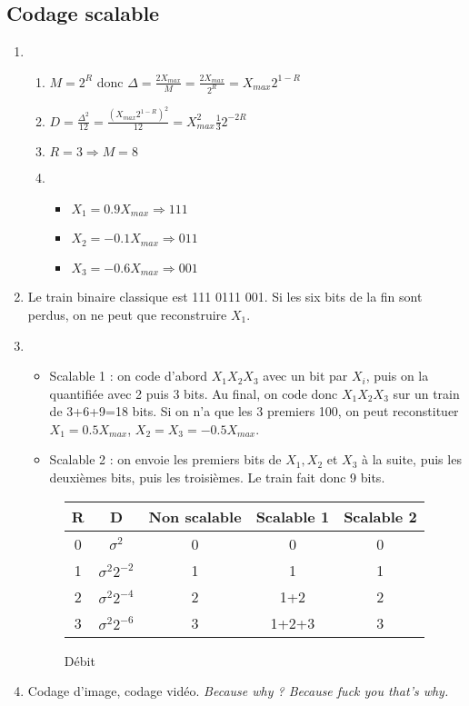 \documentclass{../../td}
\begin{document}
\subsection{Codage scalable}
\begin{enumerate}\setlength{\itemsep}{5mm}

\item
\begin{enumerate}
\item $M=2^R$ donc $\Delta = \frac{2X_{max}}{M} = \frac{2X_{max}}{2^R} = X_{max}2^{1-R}$

\item $D = \frac{\Delta^2}{12} = \frac{(X_{max}2^{1-R})^2}{12} = X_{max}^2 \frac{1}{3} 2^{-2R} $

\item $R=3 \Rightarrow M=8$

\item
\begin{itemize}
\item $X_1 = 0.9X_{max} \Rightarrow 111$
\item $X_2 = -0.1X_{max} \Rightarrow 011$
\item $X_3 = -0.6X_{max} \Rightarrow 001$
\end{itemize}
\end{enumerate}

\item Le train binaire classique est 111 0111 001. Si les six bits de la fin sont perdus, on ne peut que  reconstruire $X_1$.

\item 
\begin{itemize}
\item Scalable 1 : on code d'abord $X_1X_2X_3$ avec un bit par $X_i$, puis on la quantifiée avec 2 puis 3 bits. Au final, on code donc $X_1X_2X_3$ sur un train de 3+6+9=18 bits. Si on n'a que les 3 premiers 100, on peut reconstituer $X_1 = 0.5X_{max}$, $X_2=X_3=-0.5X_{max}$.
\item Scalable 2 : on envoie les premiers bits de $X_1,X_2$ et $X_3$ à la suite, puis les deuxièmes bits, puis les troisièmes. Le train fait donc 9 bits.
\end{itemize}

\begin{figure}
\centering
\begin{tabular}{c|c|c|c|c}
R & D & Non scalable & Scalable 1 & Scalable 2 \\ 
\hline
0 & $\sigma^2$ & 0 & 0 & 0\\
1 & $\sigma^2 2^{-2}$ & 1 & 1 & 1 \\
2 & $\sigma^2 2^{-4}$ & 2 & 1+2 & 2 \\
3 & $\sigma^2 2^{-6}$ & 3 & 1+2+3 & 3 
\end{tabular}
\caption{Débit}
\end{figure}

\item Codage d'image, codage vidéo. \textit{Because why ? Because fuck you that's why.}

\end{enumerate}
\end{document}
